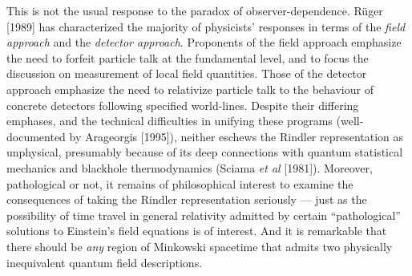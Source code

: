 \documentclass[12pt]{article}
\theoremstyle{remark}
\theoremstyle{definition}
\begin{document}
This is not the usual response to the paradox of observer-dependence.
R\"{u}ger [1989] has characterized the majority of physicists'
responses in terms of the \emph{field approach} and the \emph{detector
  approach}.  Proponents of the field approach emphasize the need to
forfeit particle talk at the fundamental level, and to focus the
discussion on measurement of local field quantities.  Those of the
detector approach emphasize the need to relativize particle talk to
the behaviour of concrete detectors following specified world-lines.
Despite their differing emphases, and the technical difficulties in
unifying these programs (well-documented by Arageorgis [1995]),
neither eschews the Rindler representation as unphysical, presumably
because of its deep connections with quantum statistical mechanics and
blackhole thermodynamics (Sciama \emph{et al} [1981]).  Moreover,
pathological or not, it remains of philosophical interest to examine
the consequences of taking the Rindler representation seriously ---
just as the possibility of time travel in general relativity admitted
by certain ``pathological'' solutions to Einstein's field equations is
of interest.  And it is remarkable that there should be \emph{any}
region of Minkowski spacetime that admits two physically inequivalent
quantum field descriptions.
 
\end{document}
